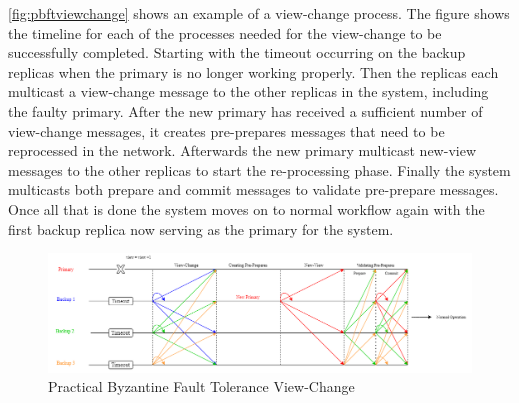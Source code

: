 \autoref{fig:pbftviewchange} shows an example of a view-change process. The figure shows the timeline for each of the processes needed for the view-change to be successfully completed. Starting with the timeout occurring on the backup replicas when the primary is no longer working properly. Then the replicas each multicast a view-change message to the other replicas in the system, including the faulty primary. After the new primary has received a sufficient number of view-change messages, it creates pre-prepares messages that need to be reprocessed in the network. Afterwards the new primary multicast new-view messages to the other replicas to start the re-processing phase. Finally the system multicasts both prepare and commit messages to validate pre-prepare messages. Once all that is done the system moves on to normal workflow again with the first backup replica now serving as the primary for the system.

\begin{figure}[!h]
	\centering
	\includegraphics[width=1.1\textwidth]{figures/PBFTViewChange}
	\caption{Practical Byzantine Fault Tolerance View-Change}
	\label{fig:pbftviewchange}
\end{figure}


